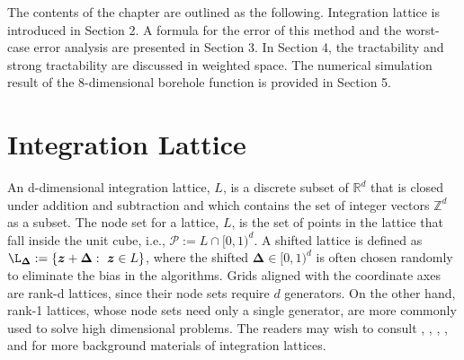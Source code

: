 \documentclass[article]{siamltex}
\def\bz{{\boldsymbol z}}
\def\calP {\mathcal {P}}
\newcommand{\Z}{{\mathbb Z}}
\newcommand{\R}{\mathbb{R}}
\begin{document}
The contents of the chapter are outlined as the following.
Integration lattice is introduced in Section 2.  %
 A formula for the error of this method
and the worst-case error analysis are  presented in  Section 3. In
Section 4, the tractability and strong tractability are discussed
in weighted space. The numerical simulation result of the
8-dimensional borehole function is provided in Section 5.

\vskip5mm
\section{Integration Lattice}
An d-dimensional integration lattice, $L$, is a discrete subset of
$\R^d$ that is closed under addition and subtraction and which
contains the set of integer vectors $\Z^d$ as a subset. The node
set for a lattice, $L$, is the set of points in the lattice that
fall inside the unit cube, i.e., $\calP:=L\cap [0,1)^d$. A shifted
lattice is defined as $\L_{\mathbf{\Delta}}:= \{
\bz+\mathbf{\Delta}:\ \bz\in L\}$, where the shifted
$\mathbf{\Delta}\in [0,1)^d$ is often chosen randomly to eliminate
the bias in the algorithms. Grids aligned with the coordinate axes
are rank-d lattices, since their node sets require $d$ generators.
On the other hand, rank-1 lattices, whose node sets need only a
single generator, are more commonly used to solve high dimensional
problems. The readers may wish to consult \cite{Hickernell1998},
\cite{HickernellNie2003}, \cite{HuaWang1981},
\cite{Niederreiter1992}, and \cite{SloJoe92} for more background
materials of integration lattices.

\smallskip
\end{document}
